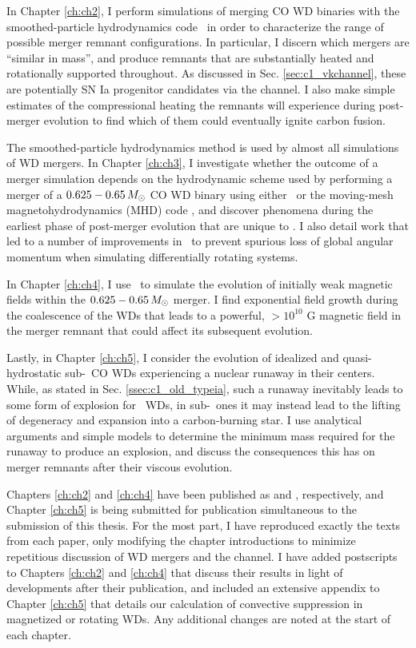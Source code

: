 In Chapter \ref{ch:ch2}, I perform simulations of merging CO WD binaries with the smoothed-particle hydrodynamics code \gasoline\ in order to characterize the range of possible merger remnant configurations.  In particular, I discern which mergers are ``similar in mass'', and produce remnants that are substantially heated and rotationally supported throughout.  As discussed in Sec. \ref{sec:c1_vkchannel}, these are potentially SN Ia progenitor candidates via the \citeal{vkercj10} channel.  I also make simple estimates of the compressional heating the remnants will experience during post-merger evolution to find which of them could eventually ignite carbon fusion.

The smoothed-particle hydrodynamics method is used by almost all simulations of WD mergers.  In Chapter \ref{ch:ch3}, I investigate whether the outcome of a merger simulation depends on the hydrodynamic scheme used by performing a merger of a $0.625 - 0.65\,\Msun$ CO WD binary using either \gasoline\ or the moving-mesh magnetohydrodynamics (MHD) code \arepo, and discover phenomena during the earliest phase of post-merger evolution that are unique to \arepo.  I also detail work that led to a number of improvements in \arepo\ to prevent spurious loss of global angular momentum when simulating differentially rotating systems.

In Chapter \ref{ch:ch4}, I use \arepo\ to simulate the evolution of initially weak magnetic fields within the $0.625 - 0.65\,\Msun$ merger.  I find exponential field growth during the coalescence of the WDs that leads to a powerful, $>10^{10}$ G magnetic field in the merger remnant that could affect its subsequent evolution.

Lastly, in Chapter \ref{ch:ch5}, I consider the evolution of idealized and quasi-hydrostatic sub-\Mch\ CO WDs experiencing a nuclear runaway in their centers.  While, as stated in Sec. \ref{ssec:c1_old_typeia}, such a runaway inevitably leads to some form of explosion for \Mch\ WDs, in sub-\Mch\ ones it may instead lead to the lifting of degeneracy and expansion into a carbon-burning star.  I use analytical arguments and simple models to determine the minimum mass required for the runaway to produce an explosion, and discuss the consequences this has on merger remnants after their viscous evolution.

Chapters \ref{ch:ch2} and \ref{ch:ch4} have been published as \cite{zhu+13} and \cite{zhu+15}, respectively, and Chapter \ref{ch:ch5} is being submitted for publication simultaneous to the submission of this thesis.  For the most part, I have reproduced exactly the texts from each paper, only modifying the chapter introductions to minimize repetitious discussion of WD mergers and the \citeal{vkercj10} channel.  I have added postscripts to Chapters \ref{ch:ch2} and \ref{ch:ch4} that discuss their results in light of developments after their publication, and included an extensive appendix to Chapter \ref{ch:ch5} that details our calculation of convective suppression in magnetized or rotating WDs.  Any additional changes are noted at the start of each chapter.

